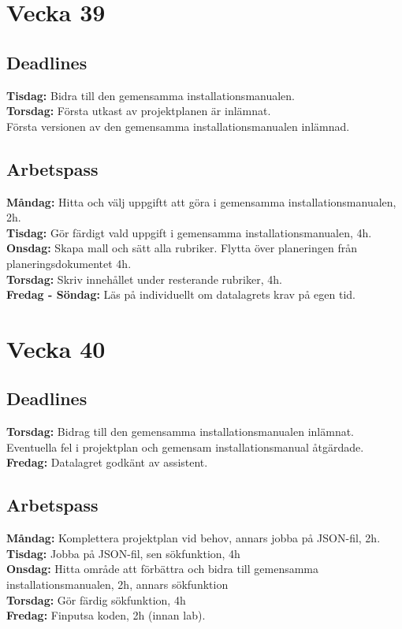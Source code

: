 \documentclass{TDP003mall}
\begin{document}
\section*{Vecka 39}




\subsection*{Deadlines}
\textbf{Tisdag: }Bidra till den gemensamma installationsmanualen.\\
\textbf{Torsdag: }Första utkast av projektplanen är inlämnat.\\
\-\hspace{47pt}Första versionen av den gemensamma installationsmanualen inlämnad.

\subsection*{Arbetspass}
\textbf{Måndag: }Hitta och välj uppgiftt att göra i gemensamma installationsmanualen, 2h.\\
\textbf{Tisdag: }Gör färdigt vald uppgift i gemensamma installationsmanualen, 4h.\\
\textbf{Onsdag: }Skapa mall och sätt alla rubriker. Flytta över planeringen från planeringsdokumentet 4h.\\
\textbf{Torsdag: }Skriv innehållet under resterande rubriker, 4h. \\
\textbf{Fredag - Söndag: }Läs på individuellt om datalagrets krav på egen tid.


\section*{Vecka 40}
\subsection*{Deadlines}
\textbf{Torsdag: }Bidrag till den gemensamma installationsmanualen inlämnat.\\
\-\hspace{47pt}Eventuella fel i projektplan och gemensam installationsmanual åtgärdade.\\
\textbf{Fredag: }Datalagret godkänt av assistent.

\subsection*{Arbetspass}
\textbf{Måndag: }Komplettera projektplan vid behov, annars jobba på JSON-fil, 2h.\\
\textbf{Tisdag: }Jobba på JSON-fil, sen sökfunktion, 4h\\
\textbf{Onsdag: }Hitta område att förbättra och bidra till gemensamma installationsmanualen, 2h, annars sökfunktion\\
\textbf{Torsdag: }Gör färdig sökfunktion, 4h\\
\textbf{Fredag: }Finputsa koden, 2h (innan lab).
\end{document}
